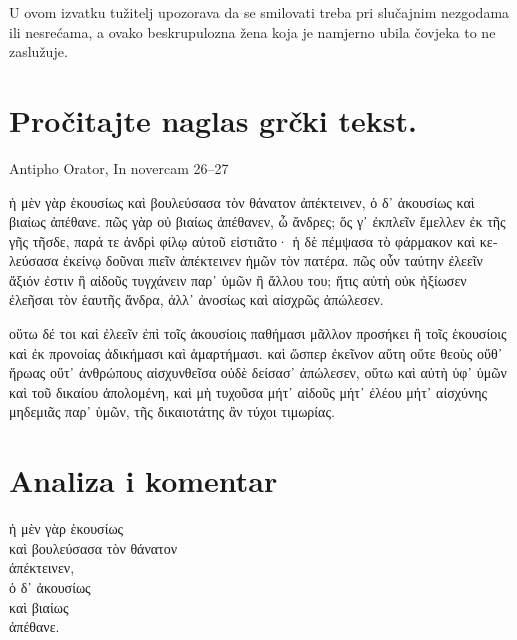 U ovom izvatku tužitelj upozorava da se smilovati treba pri slučajnim nezgodama ili nesrećama, a ovako beskrupulozna žena koja je namjerno ubila čovjeka to ne zaslužuje.



\section*{Pročitajte naglas grčki tekst.}

Antipho Orator, In novercam 26–27


\medskip


{\large

\begin{greek}

\noindent ἡ μὲν γὰρ ἑκουσίως καὶ βουλεύσασα τὸν θάνατον ἀπέκτεινεν, ὁ δ᾽ ἀκουσίως καὶ βιαίως ἀπέθανε. πῶς γὰρ οὐ βιαίως ἀπέθανεν, ὦ ἄνδρες; ὅς γ᾽ ἐκπλεῖν ἔμελλεν ἐκ τῆς γῆς τῆσδε, παρά τε ἀνδρὶ φίλῳ αὑτοῦ εἱστιᾶτο· ἡ δὲ πέμψασα τὸ φάρμακον καὶ κελεύσασα ἐκείνῳ δοῦναι πιεῖν ἀπέκτεινεν ἡμῶν τὸν πατέρα. πῶς οὖν ταύτην ἐλεεῖν ἄξιόν ἐστιν ἢ αἰδοῦς τυγχάνειν παρ᾽ ὑμῶν ἢ ἄλλου του; ἥτις αὐτὴ οὐκ ἠξίωσεν ἐλεῆσαι τὸν ἑαυτῆς ἄνδρα, ἀλλ᾽ ἀνοσίως καὶ αἰσχρῶς ἀπώλεσεν.

οὕτω δέ τοι καὶ ἐλεεῖν ἐπὶ τοῖς ἀκουσίοις παθήμασι μᾶλλον προσήκει ἢ τοῖς ἑκουσίοις καὶ ἐκ προνοίας ἀδικήμασι καὶ ἁμαρτήμασι. καὶ ὥσπερ ἐκεῖνον αὕτη οὔτε θεοὺς οὔθ᾽ ἥρωας οὔτ᾽ ἀνθρώπους αἰσχυνθεῖσα οὐδὲ δείσασ᾽ ἀπώλεσεν, οὕτω καὶ αὐτὴ ὑφ᾽ ὑμῶν καὶ τοῦ δικαίου ἀπολομένη, καὶ μὴ τυχοῦσα μήτ᾽ αἰδοῦς μήτ᾽ ἐλέου μήτ᾽ αἰσχύνης μηδεμιᾶς παρ᾽ ὑμῶν, τῆς δικαιοτάτης ἂν τύχοι τιμωρίας.

\end{greek}

}


\section*{Analiza i komentar}


{\large
\begin{greek}
\noindent ἡ μὲν γὰρ ἑκουσίως \\
\tabto{2em} καὶ βουλεύσασα τὸν θάνατον \\
ἀπέκτεινεν, \\
ὁ δ᾽ ἀκουσίως \\
\tabto{2em} καὶ βιαίως \\
ἀπέθανε.\\

\end{greek}
}


